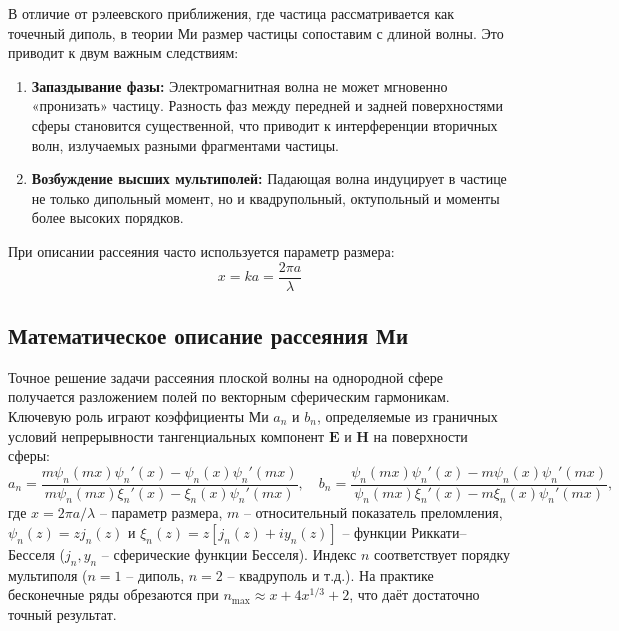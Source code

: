 \documentclass[12pt, a4paper]{article}
\begin{document}


В отличие от рэлеевского приближения, где частица рассматривается как точечный диполь, в теории Ми размер частицы сопоставим с длиной волны. Это приводит к двум важным следствиям:
\begin{enumerate}
    \item \textbf{Запаздывание фазы:} Электромагнитная волна не может мгновенно «пронизать» частицу. Разность фаз между передней и задней поверхностями сферы становится существенной, что приводит к интерференции вторичных волн, излучаемых разными фрагментами частицы.
    \item \textbf{Возбуждение высших мультиполей:} Падающая волна индуцирует в частице не только дипольный момент, но и квадрупольный, октупольный и моменты более высоких порядков.
\end{enumerate}

При описании рассеяния часто используется параметр размера:
\begin{equation}
    x = k a = \frac{2\pi a}{\lambda}
\end{equation}

\subsection*{Математическое описание рассеяния Ми}

Точное решение задачи рассеяния плоской волны на однородной сфере получается разложением полей по векторным сферическим гармоникам. Ключевую роль играют коэффициенты Ми $a_n$ и $b_n$, определяемые из граничных условий непрерывности тангенциальных компонент $\mathbf{E}$ и $\mathbf{H}$ на поверхности сферы:
\begin{equation}
    a_n = \frac{m \psi_n(mx) \psi_n'(x) - \psi_n(x) \psi_n'(mx)}{m \psi_n(mx) \xi_n'(x) - \xi_n(x) \psi_n'(mx)}, \quad
    b_n = \frac{\psi_n(mx) \psi_n'(x) - m \psi_n(x) \psi_n'(mx)}{\psi_n(mx) \xi_n'(x) - m \xi_n(x) \psi_n'(mx)},
\end{equation}
где $x = 2\pi a/\lambda$ -- параметр размера, $m$ -- относительный показатель преломления, $\psi_n(z) = z j_n(z)$ и $\xi_n(z) = z [j_n(z) + i y_n(z)]$ -- функции Риккати--Бесселя ($j_n, y_n$ -- сферические функции Бесселя). Индекс $n$ соответствует порядку мультиполя ($n=1$ -- диполь, $n=2$ -- квадруполь и т.д.). На практике бесконечные ряды обрезаются при $n_{\max} \approx x + 4x^{1/3} + 2$, что даёт достаточно точный результат.
\end{document}
